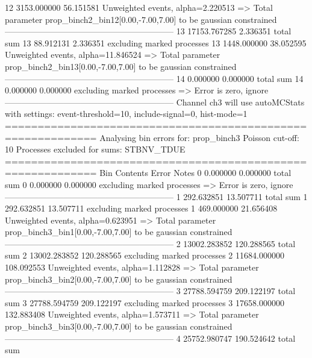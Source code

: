 12         3153.000000     56.151581       Unweighted events, alpha=2.220513
  => Total parameter prop_binch2_bin12[0.00,-7.00,7.00] to be gaussian constrained
------------------------------------------------------------
13         17153.767285    2.336351        total sum                     
13         88.912131       2.336351        excluding marked processes    
13         1448.000000     38.052595       Unweighted events, alpha=11.846524
  => Total parameter prop_binch2_bin13[0.00,-7.00,7.00] to be gaussian constrained
------------------------------------------------------------
14         0.000000        0.000000        total sum                     
14         0.000000        0.000000        excluding marked processes    
  => Error is zero, ignore      
------------------------------------------------------------
Channel ch3 will use autoMCStats with settings: event-threshold=10, include-signal=0, hist-mode=1
============================================================
Analysing bin errors for: prop_binch3
Poisson cut-off: 10
Processes excluded for sums: STBNV_TDUE
============================================================
Bin        Contents        Error           Notes                         
0          0.000000        0.000000        total sum                     
0          0.000000        0.000000        excluding marked processes    
  => Error is zero, ignore      
------------------------------------------------------------
1          292.632851      13.507711       total sum                     
1          292.632851      13.507711       excluding marked processes    
1          469.000000      21.656408       Unweighted events, alpha=0.623951
  => Total parameter prop_binch3_bin1[0.00,-7.00,7.00] to be gaussian constrained
------------------------------------------------------------
2          13002.283852    120.288565      total sum                     
2          13002.283852    120.288565      excluding marked processes    
2          11684.000000    108.092553      Unweighted events, alpha=1.112828
  => Total parameter prop_binch3_bin2[0.00,-7.00,7.00] to be gaussian constrained
------------------------------------------------------------
3          27788.594759    209.122197      total sum                     
3          27788.594759    209.122197      excluding marked processes    
3          17658.000000    132.883408      Unweighted events, alpha=1.573711
  => Total parameter prop_binch3_bin3[0.00,-7.00,7.00] to be gaussian constrained
------------------------------------------------------------
4          25752.980747    190.524642      total sum                     
